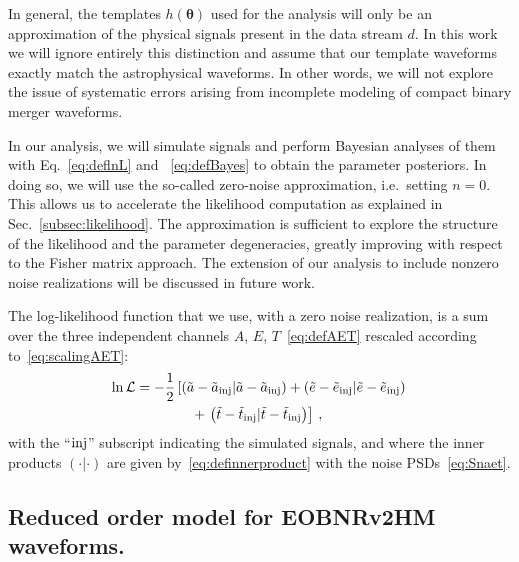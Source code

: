 \documentclass[aps,showpacs,twocolumn,prd,superscriptaddress,nofootinbib]{revtex4-1}
\newcommand\calL{{\mathcal{L}}}
\newcommand{\nn}{\nonumber}
\begin{document}
In general, the templates $h(\bm{\theta})$ used for the analysis will only be an approximation of the physical signals present in the data stream $d$.
In this work we will ignore entirely this distinction and assume that our template waveforms exactly match the astrophysical waveforms.
In other words, we will not explore the issue of systematic errors arising from incomplete modeling of compact binary merger waveforms.

In our analysis, we will simulate signals and perform Bayesian analyses of them with Eq.~\eqref{eq:deflnL} and ~\eqref{eq:defBayes} to obtain the parameter posteriors.
In doing so, we will use the so-called zero-noise approximation, i.e.~setting $n=0$.
This allows us to accelerate the likelihood computation as explained in Sec.~\ref{subsec:likelihood}.
The approximation is sufficient to explore the structure of the likelihood and the parameter degeneracies, greatly improving with respect to the Fisher matrix approach.
The extension of our analysis to include nonzero noise realizations will be discussed in future work.

The log-likelihood function that we use, with a zero noise realization, is a sum over the three independent channels $A$, $E$, $T$~\eqref{eq:defAET} rescaled according to~\eqref{eq:scalingAET}:
\begin{align}\label{eq:deflnLaet}
	\ln\calL &= -\frac{1}{2} \left[ \left( \tilde{a} - \tilde{a}_{\rm inj} | \tilde{a} - \tilde{a}_{\rm inj}  \right) + \left( \tilde{e} - \tilde{e}_{\rm inj} | \tilde{e} - \tilde{e}_{\rm inj}  \right) \right. \nn\\
	& \qquad\qquad + \left. \left( \tilde{t} - \tilde{t}_{\rm inj} | \tilde{t} - \tilde{t}_{\rm inj} \right) \right] \,,
\end{align}
with the ``$\rm inj$'' subscript indicating the simulated signals, and where the inner products $(\cdot | \cdot)$ are given by~\eqref{eq:definnerproduct} with the noise PSDs~\eqref{eq:Snaet}.



\subsection{Reduced order model for EOBNRv2HM waveforms.}
\label{subsec:ROM}
\end{document}
